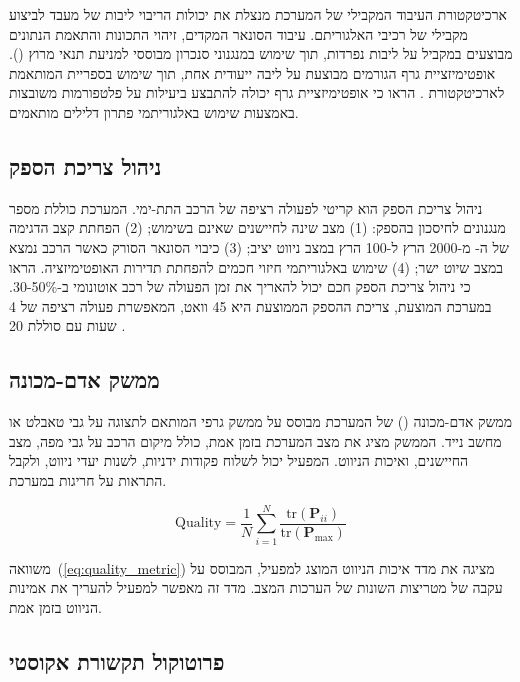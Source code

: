 ארכיטקטורת העיבוד המקבילי של המערכת מנצלת את יכולות הריבוי ליבות של מעבד  לביצוע מקבילי של רכיבי האלגוריתם. עיבוד הסונאר המקדים, זיהוי התכונות והתאמת הנתונים מבוצעים במקביל על ליבות נפרדות, תוך שימוש במנגנוני סנכרון מבוססי  למניעת תנאי מרוץ (). אופטימיזציית גרף הגורמים מבוצעת על ליבה ייעודית אחת, תוך שימוש בספריית  המותאמת לארכיטקטורת . \citet{Grisetti2010g2o} הראו כי אופטימיזציית גרף יכולה להתבצע ביעילות על פלטפורמות משובצות באמצעות שימוש באלגוריתמי פתרון דלילים מותאמים.

\subsection{ניהול צריכת הספק}
\label{sec:power_management}

ניהול צריכת הספק הוא קריטי לפעולה רציפה של הרכב התת-ימי. המערכת כוללת מספר מנגנונים לחיסכון בהספק: (1) מצב שינה לחיישנים שאינם בשימוש; (2) הפחתת קצב הדגימה של ה- מ-2000 הרץ ל-100 הרץ במצב ניווט יציב; (3) כיבוי הסונאר הסורק כאשר הרכב נמצא במצב שיוט ישר; (4) שימוש באלגוריתמי חיזוי חכמים להפחתת תדירות האופטימיזציה. \citet{Thrun2005ProbRobotics} הראו כי ניהול צריכת הספק חכם יכול להאריך את זמן הפעולה של רכב אוטונומי ב-30-50\%. במערכת המוצעת, צריכת ההספק הממוצעת היא 45 וואט, המאפשרת פעולה רציפה של 4 שעות עם סוללת 20 .

\subsection{ממשק אדם-מכונה}
\label{sec:human_machine_interface}

ממשק אדם-מכונה () של המערכת מבוסס על ממשק גרפי המותאם לתצוגה על גבי טאבלט או מחשב נייד. הממשק מציג את מצב המערכת בזמן אמת, כולל מיקום הרכב על גבי מפה, מצב החיישנים, ואיכות הניווט. המפעיל יכול לשלוח פקודות ידניות, לשנות יעדי ניווט, ולקבל התראות על חריגות במערכת.

\begin{equation}
\text{Quality} = \frac{1}{N} \sum_{i=1}^{N} \frac{\text{tr}(\mathbf{P}_{ii})}{\text{tr}(\mathbf{P}_{\text{max}})}
\label{eq:quality_metric}
\end{equation}

משוואה~(\ref{eq:quality_metric}) מציגה את מדד איכות הניווט המוצג למפעיל, המבוסס על עקבה של מטריצות השונות של הערכות המצב. מדד זה מאפשר למפעיל להעריך את אמינות הניווט בזמן אמת.

\subsection{פרוטוקול תקשורת אקוסטי}
\label{sec:acoustic_communication}

